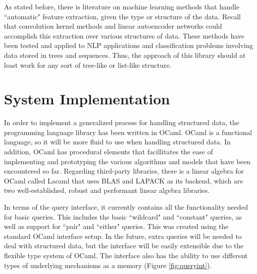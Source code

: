 \documentclass{sig-alternate}
\begin{document}
As stated before, there is literature on machine learning methods that handle ``automatic" feature 
extraction, given the type or structure of the data. Recall that convolution kernel methods and 
linear autoencoder networks could accomplish this extraction over various structures of data. These 
methods have been tested and applied to NLP applications and classification problems involving data 
stored in trees and sequences.  Thus, the approach of this library should at least work for any sort 
of tree-like or list-like structure.

\section{System Implementation}
\label{sec:sysimp}

In order to implement a generalized process for handling structured data, the programming language 
library has been written in OCaml. OCaml is a functional language, so it will be more fluid to use 
when handling structured data. In addition, OCaml has procedural elements that facillitates the ease 
of implementing and prototyping the various algorithms and models that have been encountered so far. 
Regarding third-party libraries, there is a linear algebra for OCaml called Lacaml that uses BLAS 
and LAPACK as its backend, which are two well-established, robust and performant linear algebra 
libraries.

In terms of the query interface, it currently contains all the functionality needed for basic 
queries.  This includes the basic ``wildcard" and ``constant" queries, as well as support for 
``pair" and ``either" queries. This was created using the standard OCaml interface setup. In the 
future, extra queries will be needed to deal with structured data, but the interface will be easily 
extensible due to the flexible type system of OCaml. The interface also has the ability to use 
different types of underlying mechanisms as a memory (Figure \ref{fig:queryint}).
\end{document}
